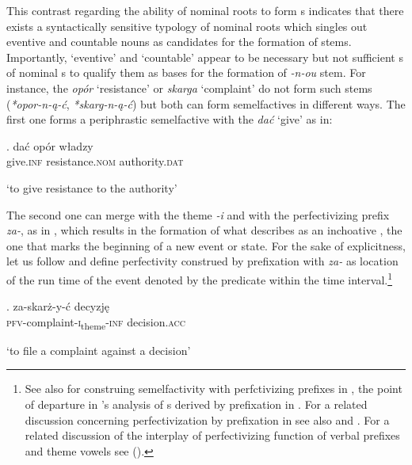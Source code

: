 \noindent
This contrast regarding the ability of nominal roots to form  s indicates that there exists a syntactically sensitive typology of nominal roots which singles out eventive and countable nouns as candidates for the formation of  stems. Importantly, `eventive' and `countable' appear to be necessary but not sufficient s of nominal s to qualify them as bases for the formation of  \textit{-n-ou} stem. For instance, the  \textit{op\'or} `resistance' or \textit{skarga} `complaint' do not form such stems (\textit{*opor-n-\k{a}-\'c}, \textit{*skarg-n-\k{a}-\'c}) but both can form semelfactives in different ways. The first one forms a periphrastic semelfactive with the  \textit{da\'c} `give' as in:

\exg. 
da\'c  op\'or w\l adzy\\
give.\textsc{inf}  resistance.\textsc{nom} authority.\textsc{dat}\\
\strut `to give resistance to the authority'

The second one can merge with the  theme \textit{-i} and with the perfectivizing  prefix \textit{za-}, as in \Next, which results in the formation of what \cite[116]{Bacz2012} describes as an inchoative , the one that marks the beginning of a new event or state. For the sake of explicitness, let us follow \citet[\S6.5]{Klein1994} and define perfectivity construed by prefixation with \textit{za-} as location of the run time of the event denoted by the predicate within the time interval.\footnote{See also \cite{DickeyJanda2009} for construing semelfactivity with perfctivizing prefixes in , the point of departure in \citeauthor{Bacz2012}'s \citeyearpar{Bacz2012} analysis of s  derived by prefixation in . For a related discussion concerning perfectivization by prefixation in  see also \cite{Grzegorczykowa1997} and \citet[187--189]{Willim2006}. For a related discussion of the interplay of perfectivizing function of verbal prefixes and theme vowels  see \citeauthor{Jablonska2004} (\citeyear{Jablonska2004,Jablonska2007}).
}%

\exg. 
za-skar\.z-y-\'c decyzj\k{e}\\
\textsc{pfv}-complaint-\textsc{i}\textsubscript{theme}-\textsc{inf} decision.\textsc{acc}\\
\strut `to file a complaint against a decision'\label{zaskar}

